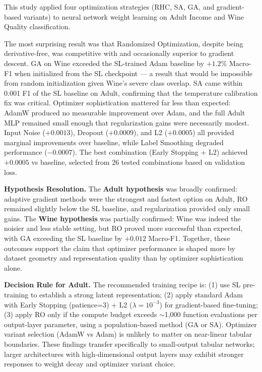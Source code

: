 \documentclass[letterpaper, 10 pt, conference]{ieeeconf}
\begin{document}
This study applied four optimization strategies (RHC, SA, GA, and gradient-based variants) to neural network weight learning on Adult Income and Wine Quality classification.

The most surprising result was that Randomized Optimization, despite being derivative-free, was competitive with and occasionally superior to gradient descent. GA on Wine exceeded the SL-trained Adam baseline by $+1.2\%$ Macro-F1 when initialized from the SL checkpoint --- a result that would be impossible from random initialization given Wine's severe class overlap. SA came within 0.001 F1 of the SL baseline on Adult, confirming that the temperature calibration fix was critical. Optimizer sophistication mattered far less than expected: AdamW produced no measurable improvement over Adam, and the full Adult MLP remained small enough that regularization gains were necessarily modest. Input Noise ($+0.0013$), Dropout ($+0.0009$), and L2 ($+0.0005$) all provided marginal improvements over baseline, while Label Smoothing degraded performance ($-0.0007$). The best combination (Early Stopping + L2) achieved $+0.0005$ vs baseline, selected from 26 tested combinations based on validation loss.

\textbf{Hypothesis Resolution.} The \textbf{Adult hypothesis} was broadly confirmed: adaptive gradient methods were the strongest and fastest option on Adult, RO remained slightly below the SL baseline, and regularization provided only small gains. The \textbf{Wine hypothesis} was partially confirmed: Wine was indeed the noisier and less stable setting, but RO proved more successful than expected, with GA exceeding the SL baseline by $+0.012$ Macro-F1. Together, these outcomes support the claim that optimizer performance is shaped more by dataset geometry and representation quality than by optimizer sophistication alone.

\textbf{Decision Rule for Adult.} The recommended training recipe is: (1) use SL pre-training to establish a strong latent representation; (2) apply standard Adam with Early Stopping (patience=3) + L2 ($\lambda=10^{-3}$) for gradient-based fine-tuning; (3) apply RO only if the compute budget exceeds $\sim$1{,}000 function evaluations per output-layer parameter, using a population-based method (GA or SA). Optimizer variant selection (AdamW vs Adam) is unlikely to matter on near-linear tabular boundaries. These findings transfer specifically to small-output tabular networks; larger architectures with high-dimensional output layers may exhibit stronger responses to weight decay and optimizer variant choice.
\end{document}
